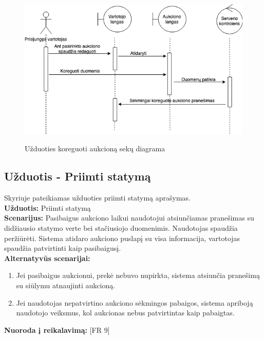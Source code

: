 \documentclass{VUMIFPSkursinis}
\begin{document}
			\begin{figure}[H]
		\centering
		\includegraphics[width=\linewidth]{img/editAuctionSequence.png}
		\label{fig:koregavimas}
		\caption{Užduoties koreguoti aukcioną sekų diagrama}
	\end{figure}

	\subsection{Užduotis - Priimti statymą}
	Skyriuje pateikiamas užduoties priimti statymą aprašymas.\\
	\textbf{Užduotis:}  Priimti statymą \\
	\textbf{Scenarijus:}  Pasibaigus aukciono laikui naudotojui atsiunčiamas pranešimas su didžiausio statymo verte bei stačiusiojo duomenimis. Naudotojas spaudžia peržiūrėti. Sistema atidaro aukciono puslapį su visa informacija, vartotojas spaudžia patvirtinti kaip pasibaigusį.  \\
	\textbf{Alternatyvūs scenarijai:}
	\begin{enumerate}
		\item Jei pasibaigus aukcionui, prekė nebuvo nupirkta, sistema atsiunčia pranešimą su siūlymu atnaujinti aukcioną.
		\item Jei naudotojas nepatvirtino aukciono sėkmingos pabaigos, sistema apriboją naudotojo veiksmus, kol aukcionas nebus patvirtintas kaip pabaigtas.
	\end{enumerate}
	\textbf{Nuoroda į reikalavimą: } [FR 9]
	
\end{document}
